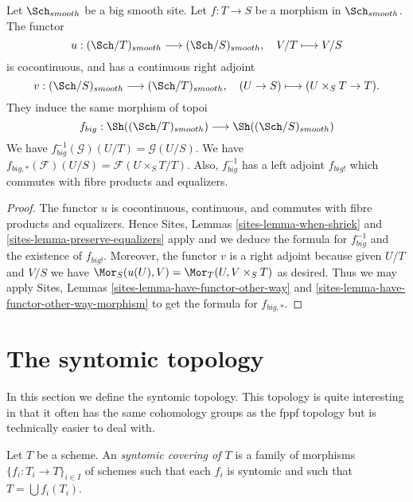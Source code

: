 \begin{lemma}
\label{lemma-morphism-big-smooth}
Let $\Sch_{smooth}$ be a big smooth site.
Let $f : T \to S$ be a morphism in $\Sch_{smooth}$.
The functor
$$
u : (\Sch/T)_{smooth} \longrightarrow (\Sch/S)_{smooth},
\quad
V/T \longmapsto V/S
$$
is cocontinuous, and has a continuous right adjoint
$$
v : (\Sch/S)_{smooth} \longrightarrow (\Sch/T)_{smooth},
\quad
(U \to S) \longmapsto (U \times_S T \to T).
$$
They induce the same morphism of topoi
$$
f_{big} :
\Sh((\Sch/T)_{smooth})
\longrightarrow
\Sh((\Sch/S)_{smooth})
$$
We have $f_{big}^{-1}(\mathcal{G})(U/T) = \mathcal{G}(U/S)$.
We have $f_{big, *}(\mathcal{F})(U/S) = \mathcal{F}(U \times_S T/T)$.
Also, $f_{big}^{-1}$ has a left adjoint $f_{big!}$ which commutes with
fibre products and equalizers.
\end{lemma}

\begin{proof}
The functor $u$ is cocontinuous, continuous, and commutes with fibre products
and equalizers. Hence
Sites, Lemmas \ref{sites-lemma-when-shriek} and
\ref{sites-lemma-preserve-equalizers}
apply and we deduce the formula
for $f_{big}^{-1}$ and the existence of $f_{big!}$. Moreover,
the functor $v$ is a right adjoint because given $U/T$ and $V/S$
we have $\Mor_S(u(U), V) = \Mor_T(U, V \times_S T)$
as desired. Thus we may apply
Sites, Lemmas \ref{sites-lemma-have-functor-other-way} and
\ref{sites-lemma-have-functor-other-way-morphism} to get the
formula for $f_{big, *}$.
\end{proof}











\section{The syntomic topology}
\label{section-syntomic}

\noindent
In this section we define the syntomic topology.
This topology is quite interesting in that it often
has the same cohomology groups as the fppf topology
but is technically easier to deal with.

\begin{definition}
\label{definition-syntomic-covering}
Let $T$ be a scheme. An {\it syntomic covering of $T$} is a family
of morphisms $\{f_i : T_i \to T\}_{i \in I}$ of schemes
such that each $f_i$ is syntomic and such
that $T = \bigcup f_i(T_i)$.
\end{definition}

